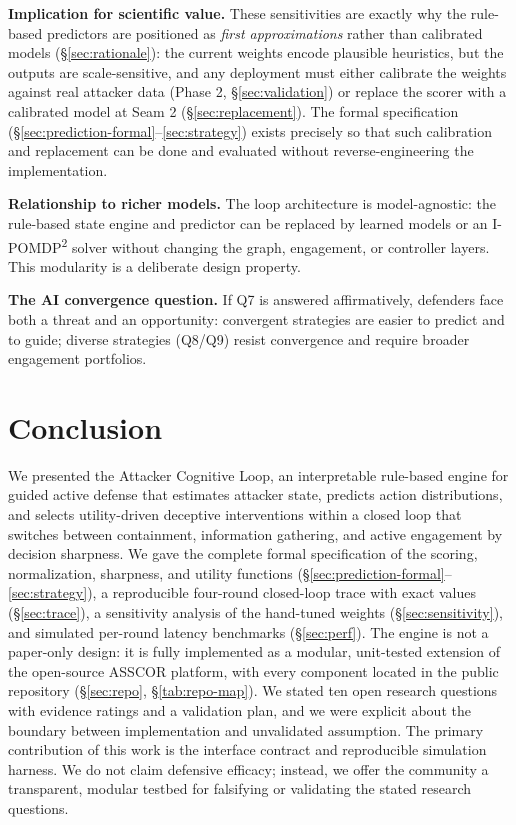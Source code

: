 \documentclass[11pt]{article}
\begin{document}
\textbf{Implication for scientific value.} These sensitivities are exactly
why the rule-based predictors are positioned as \textit{first
approximations} rather than calibrated models (\S\ref{sec:rationale}): the
current weights encode plausible heuristics, but the outputs are
scale-sensitive, and any deployment must either calibrate the weights
against real attacker data (Phase 2, \S\ref{sec:validation}) or replace the
scorer with a calibrated model at Seam 2 (\S\ref{sec:replacement}). The
formal specification (\S\ref{sec:prediction-formal}--\ref{sec:strategy})
exists precisely so that such calibration and replacement can be done and
evaluated without reverse-engineering the implementation.

\textbf{Relationship to richer models.} The loop architecture is
model-agnostic: the rule-based state engine and predictor can be replaced by
learned models or an I-POMDP\textsuperscript{2} solver without changing the
graph, engagement, or controller layers. This modularity is a deliberate
design property.

\textbf{The AI convergence question.} If Q7 is answered affirmatively,
defenders face both a threat and an opportunity: convergent strategies are
easier to predict and to guide; diverse strategies (Q8/Q9) resist
convergence and require broader engagement portfolios.

\section{Conclusion}
\label{sec:conclusion}

We presented the Attacker Cognitive Loop, an interpretable rule-based engine
for guided active defense that estimates attacker state, predicts action
distributions, and selects utility-driven deceptive interventions within a
closed loop that switches between containment, information gathering, and
active engagement by decision sharpness. We gave the complete formal
specification of the scoring, normalization, sharpness, and utility
functions (\S\ref{sec:prediction-formal}--\ref{sec:strategy}), a
reproducible four-round closed-loop trace with exact values
(\S\ref{sec:trace}), a sensitivity analysis of the hand-tuned weights
(\S\ref{sec:sensitivity}), and simulated per-round latency benchmarks
(\S\ref{sec:perf}). The engine is not a paper-only design: it is fully
implemented as a modular, unit-tested extension of the open-source ASSCOR
platform, with every component located in the public repository
(\S\ref{sec:repo}, \S\ref{tab:repo-map}). We stated ten open
research questions with evidence ratings and a validation plan, and we were
explicit about the boundary between implementation and unvalidated
assumption. The primary contribution of this work is the interface contract
and reproducible simulation harness. We do not claim defensive efficacy;
instead, we offer the community a transparent, modular testbed for
falsifying or validating the stated research questions.
\end{document}
